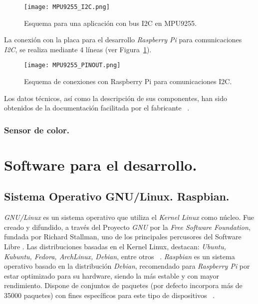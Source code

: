 \begin{figure}[!h]
\begin{center}
\texttt{[image: MPU9255\_I2C.png]}
\caption{Esquema para una aplicación con bus I2C en MPU9255.}
\label{fig:MPU9255_I2C}
\end{center}
\end{figure}

La conexión con la placa para el desarrollo \emph{Raspberry Pi} para comunicaciones \emph{I2C}, se realiza mediante 4 líneas (ver Figura~\ref{fig:MPU9255_I2C}).

\begin{figure}[!h]
\begin{center}
\texttt{[image: MPU9255\_PINOUT.png]}
\caption{Esquema de conexiones con Raspberry Pi para comunicaciones I2C.}
\label{fig:MPU9255_PINOUT}
\end{center}
\end{figure}

Los datos técnicos, así como la descripción de sus componentes, han sido obtenidos de la documentación facilitada por el fabricante ~\cite{MPU9255}.


\subsubsection{Sensor de color.}





\section{Software para el desarrollo.}
\label{sec:software}

\subsection{Sistema Operativo GNU/Linux. Raspbian.}
\label{subs:raspbian}
\emph{GNU/Linux} es un sistema operativo que utiliza el \emph{Kernel Linux} como núcleo. Fue creado y difundido, a través del Proyecto \emph{GNU} por la \emph{Free Software Foundation}, fundada por Richard Stallman, uno de los principales percusores del Software Libre .
Las distribuciones basadas en el Kernel Linux, destacan: \emph{Ubuntu, Kubuntu, Fedora, ArchLinux, Debian}, entre otros ~\cite{Upton}. 
\emph{Raspbian} es un sistema operativo basado en la distribución \emph{Debian}, recomendado para \emph{Raspberry Pi} por estar optimizado para su hardware, siendo la más estable y con mayor rendimiento. Dispone de conjuntos de paquetes (por defecto incorpora más de 35000 paquetes) con fines específicos para este tipo de dispositivos ~\cite{Upton}.

